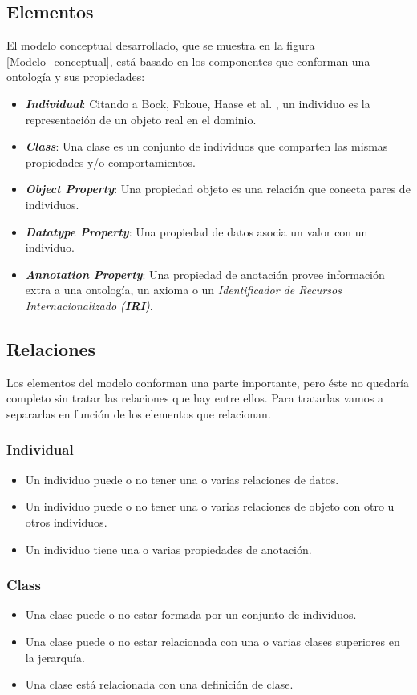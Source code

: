 \subsection{Elementos}\label{Elementos_modelo_conceptual}
El modelo conceptual desarrollado, que se muestra en la figura \ref{Modelo_conceptual}, está basado en los componentes 
que conforman una ontología y sus propiedades:
\begin{itemize}
    \item \textit{\textbf{Individual}}: Citando a Bock, Fokoue, Haase et al. \autocite*{Bock2012}, un individuo es la 
    representación de un objeto real en el dominio.
    \item \textit{\textbf{Class}}: Una clase es un conjunto de individuos que comparten las mismas propiedades y/o 
    comportamientos. \newpage
    \item \textit{\textbf{Object Property}}: Una propiedad objeto es una relación que conecta pares de individuos.
    \item \textit{\textbf{Datatype Property}}: Una propiedad de datos asocia un valor con un individuo.
    \item \textit{\textbf{Annotation Property}}: Una propiedad de anotación provee información extra a una ontología, un axioma 
    o un \textit{Identificador de Recursos Internacionalizado (\textbf{IRI})}.
\end{itemize}

\subsection{Relaciones}
Los elementos del modelo conforman una parte importante, pero éste no quedaría completo sin tratar las relaciones que hay entre 
ellos. Para tratarlas vamos a separarlas en función de los elementos que relacionan.
\subsubsection{Individual}
\begin{itemize}
    \item Un individuo puede o no tener una o varias relaciones de datos.
    \item Un individuo puede o no tener una o varias relaciones de objeto con otro u otros individuos.
    \item Un individuo tiene una o varias propiedades de anotación.
\end{itemize}

\subsubsection{Class}
\begin{itemize}
    \item Una clase puede o no estar formada por un conjunto de individuos.
    \item Una clase puede o no estar relacionada con una o varias clases superiores en la jerarquía.
    \item Una clase está relacionada con una definición de clase.
\end{itemize}

